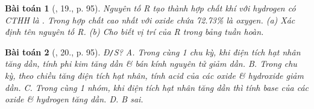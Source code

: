 \documentclass{article}
\newtheorem{baitoan}{Bài toán}
\begin{document}
\begin{baitoan}[\cite{An_Hoa_Hoc_nang_cao_8_9}, 19., p. 95]
	Nguyên tố R tạo thành hợp chất khí với hydrogen có {\rm CTHH} là {\rm{}}. Trong hợp chất cao nhất với oxide chứa {\rm72.73\%} là oxygen. (a) Xác định tên nguyên tố R. (b) Cho biết vị trí của R trong bảng tuần hoàn.
\end{baitoan}

\begin{baitoan}[\cite{An_Hoa_Hoc_nang_cao_8_9}, 20., p. 95]
	{\rm Đ{\tt/}S?} {\sf A.} Trong cùng 1 chu kỳ, khi điện tích hạt nhân tăng dần, tính phi kim tăng dần \& bán kính nguyên tử giảm dần. {\sf B.} Trong chu kỳ, theo chiều tăng điện tích hạt nhân, tính acid của các oxide \& hydroxide giảm dần. {\sf C.} Trong cùng 1 nhóm, khi điện tích hạt nhân tăng dần thì tính base của các oxide \& hydrogen tăng dần. {\sf D. B} sai.
\end{baitoan}


\printbibliography[heading=bibintoc]
\end{document}
